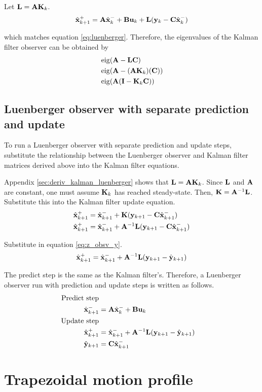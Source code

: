 Let $\mathbf{L} = \mathbf{A} \mathbf{K}_k$.
\begin{equation}
  \hat{\mathbf{x}}_{k+1}^+ = \mathbf{A}\hat{\mathbf{x}}_k^- + \mathbf{B}\mathbf{u}_k + \mathbf{L}
    (\mathbf{y}_k - \mathbf{C}\hat{\mathbf{x}}_k^-)
\end{equation}

which matches equation \eqref{eq:luenberger}. Therefore, the eigenvalues of the
Kalman filter \gls{observer} can be obtained by
\begin{align}
  &\operatorname{eig}(\mathbf{A} - \mathbf{L}\mathbf{C}) \nonumber \\
  &\operatorname{eig}(\mathbf{A} - (\mathbf{A}\mathbf{K}_k)(\mathbf{C})) \nonumber \\
  &\operatorname{eig}(\mathbf{A}(\mathbf{I} - \mathbf{K}_k\mathbf{C}))
\end{align}

\subsection{Luenberger observer with separate prediction and update}
\label{subsec:deriv_luenberger_separate}

To run a Luenberger \gls{observer} with separate prediction and update steps,
substitute the relationship between the Luenberger \gls{observer} and Kalman
filter matrices derived above into the Kalman filter equations.

Appendix \ref{sec:deriv_kalman_luenberger} shows that
$\mathbf{L} = \mathbf{A}\mathbf{K}_k$. Since $\mathbf{L}$ and $\mathbf{A}$ are constant, one
must assume $\mathbf{K}_k$ has reached steady-state. Then,
$\mathbf{K} = \mathbf{A}^{-1}\mathbf{L}$. Substitute this into the Kalman filter update
equation.
\begin{align*}
  \hat{\mathbf{x}}_{k+1}^+ &= \hat{\mathbf{x}}_{k+1}^- + \mathbf{K}(\mathbf{y}_{k+1} -
    \mathbf{C}\hat{\mathbf{x}}_{k+1}^-) \\
  \hat{\mathbf{x}}_{k+1}^+ &= \hat{\mathbf{x}}_{k+1}^- + \mathbf{A}^{-1}\mathbf{L}
    (\mathbf{y}_{k+1} - \mathbf{C}\hat{\mathbf{x}}_{k+1}^-)
\end{align*}

Substitute in equation \eqref{eq:z_obsv_y}.
\begin{equation*}
  \hat{\mathbf{x}}_{k+1}^+ = \hat{\mathbf{x}}_{k+1}^- + \mathbf{A}^{-1}\mathbf{L}
    (\mathbf{y}_{k+1} - \hat{\mathbf{y}}_{k+1})
\end{equation*}

The predict step is the same as the Kalman filter's. Therefore, a Luenberger
\gls{observer} run with prediction and update steps is written as follows.
\begin{align}
  \text{Predict step} \nonumber \\
  \hat{\mathbf{x}}_{k+1}^- &= \mathbf{A}\hat{\mathbf{x}}_k^- + \mathbf{B}\mathbf{u}_k \\
  \text{Update step} \nonumber \\
  \hat{\mathbf{x}}_{k+1}^+ &= \hat{\mathbf{x}}_{k+1}^- + \mathbf{A}^{-1}\mathbf{L}
    (\mathbf{y}_{k+1} - \hat{\mathbf{y}}_{k+1}) \\
  \hat{\mathbf{y}}_{k+1} &= \mathbf{C} \hat{\mathbf{x}}_{k+1}^-
\end{align}

\section{Trapezoidal motion profile}
\label{sec:deriv_trapezoid_profile}
